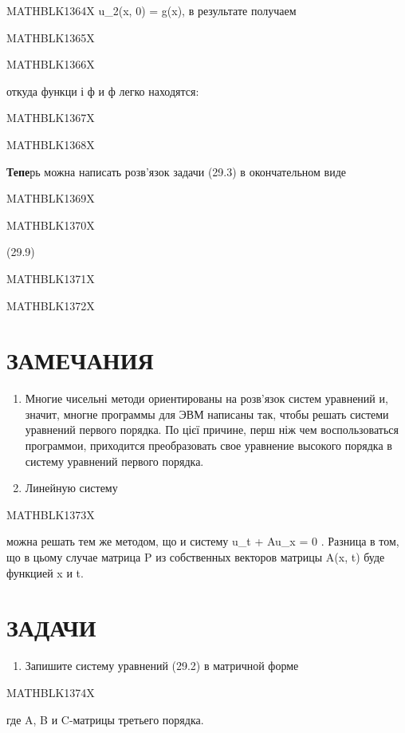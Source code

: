 \documentclass[
  ukrainian,
]{article}
\providecommand{\tightlist}{%
  \setlength{\itemsep}{0pt}\setlength{\parskip}{0pt}}
\begin{document}
MATHBLK1364X u\_2(x, 0) = g(x), в результате получаем

MATHBLK1365X

MATHBLK1366X

откуда функци і ф и ф легко находятся:

MATHBLK1367X

MATHBLK1368X

\textbf{Тепе}рь можна написать розв'язок задачи (29.3) в окончательном
виде

MATHBLK1369X

MATHBLK1370X

(29.9)

MATHBLK1371X

MATHBLK1372X

\section{ЗАМЕЧАНИЯ}\label{ux437ux430ux43cux435ux447ux430ux43dux438ux44f-10}

\begin{enumerate}
\def\labelenumi{\arabic{enumi}.}
\item
  Многие чисельні методи ориентированы на розв'язок систем уравнений и,
  значит, многне программы для ЭВМ написаны так, чтобы решать системи
  уравнений первого порядка. По цієї причине, перш ніж чем
  воспользоваться программои, приходится преобразовать свое уравнение
  высокого порядка в систему уравнений первого порядка.
\item
  Линейную систему
\end{enumerate}

MATHBLK1373X

можна решать тем же методом, що и систему u\_t + Au\_x = 0 . Разница в
том, що в цьому случае матрица P из собственных векторов матрицы A(x, t)
буде функцией x и t.

\section{ЗАДАЧИ}\label{ux437ux430ux434ux430ux447ux438-9}

\begin{enumerate}
\def\labelenumi{\arabic{enumi}.}
\tightlist
\item
  Запишите систему уравнений (29.2) в матричной форме
\end{enumerate}

MATHBLK1374X

где A, B и C-матрицы третьего порядка.
\end{document}
